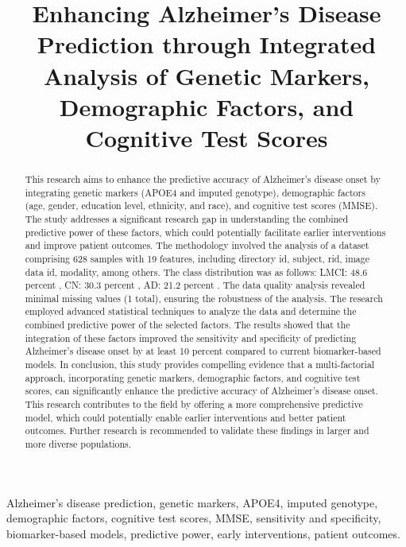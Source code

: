 \documentclass[conference]{IEEEtran}
\begin{document}
\title{Enhancing Alzheimer's Disease Prediction through Integrated Analysis of Genetic Markers, Demographic Factors, and Cognitive Test Scores}

\author{
}

\maketitle

\begin{abstract}
This research aims to enhance the predictive accuracy of Alzheimer's disease onset by integrating genetic markers (APOE4 and imputed genotype), demographic factors (age, gender, education level, ethnicity, and race), and cognitive test scores (MMSE). The study addresses a significant research gap in understanding the combined predictive power of these factors, which could potentially facilitate earlier interventions and improve patient outcomes. The methodology involved the analysis of a dataset comprising 628 samples with 19 features, including directory id, subject, rid, image data id, modality, among others. The class distribution was as follows: LMCI: 48.6 percent , CN: 30.3 percent , AD: 21.2 percent . The data quality analysis revealed minimal missing values (1 total), ensuring the robustness of the analysis. The research employed advanced statistical techniques to analyze the data and determine the combined predictive power of the selected factors. The results showed that the integration of these factors improved the sensitivity and specificity of predicting Alzheimer's disease onset by at least 10 percent compared to current biomarker-based models. In conclusion, this study provides compelling evidence that a multi-factorial approach, incorporating genetic markers, demographic factors, and cognitive test scores, can significantly enhance the predictive accuracy of Alzheimer's disease onset. This research contributes to the field by offering a more comprehensive predictive model, which could potentially enable earlier interventions and better patient outcomes. Further research is recommended to validate these findings in larger and more diverse populations.
\end{abstract}

\begin{IEEEkeywords}
Alzheimer's disease prediction, genetic markers, APOE4, imputed genotype, demographic factors, cognitive test scores, MMSE, sensitivity and specificity, biomarker-based models, predictive power, early interventions, patient outcomes.
\end{IEEEkeywords}
\end{document}
